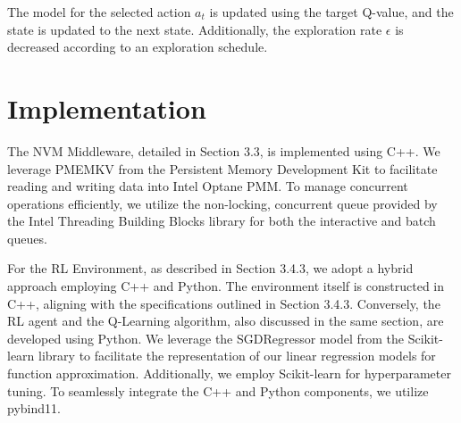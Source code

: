 The model for the selected action $a_t$ is updated using the target Q-value, and the state is updated to the next state. Additionally, the exploration rate $\epsilon$ is decreased according to an exploration schedule.

\section{Implementation}

The NVM Middleware, detailed in Section 3.3, is implemented using C++. We leverage PMEMKV from the Persistent Memory Development Kit \cite{pmdk:book} to facilitate reading and writing data into Intel Optane PMM. To manage concurrent operations efficiently, we utilize the non-locking, concurrent queue provided by the Intel Threading Building Blocks \cite{tbb:online} library for both the interactive and batch queues.

For the RL Environment, as described in Section 3.4.3, we adopt a hybrid approach employing C++ and Python. The environment itself is constructed in C++, aligning with the specifications outlined in Section 3.4.3. Conversely, the RL agent and the Q-Learning algorithm, also discussed in the same section, are developed using Python. We leverage the SGDRegressor model from the Scikit-learn\cite{scikitle61:online} library to facilitate the representation of our linear regression models for function approximation. Additionally, we employ Scikit-learn for hyperparameter tuning. To seamlessly integrate the C++ and Python components, we utilize pybind11\cite{pybind1111:online}.